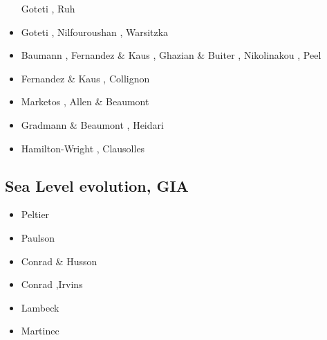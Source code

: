 \begin{scriptsize}
\begin{itemize}
                          Goteti \etal \cite{goib12}, Ruh \etal \cite{rukb12}
\item[\twothousandthirteen] Goteti \etal \cite{gobi13}, Nilfouroushan \etal \cite{nipc13}, 
                            Warsitzka \etal \cite{wakk13}
\item[\twothousandfourteen] Baumann \etal \cite{bakp14}, Fernandez \& Kaus \cite{feka14a,feka14b},
                            Ghazian \& Buiter \cite{ghbu14}, Nikolinakou \etal \cite{nifh14}, 
                            Peel \cite{peel14}
\item[\twothousandfifteen] Fernandez \& Kaus \cite{feka15}, Collignon \etal \cite{cofk15}
\item[\twothousandsixteen] Marketos \etal \cite{masg16}, Allen \& Beaumont \cite{albe16}
\item[\twothousandseventeen] Gradmann \& Beaumont \cite{grbe17}, Heidari \etal \cite{henf17}
\item[\twothousandnineteen] Hamilton-Wright \etal \cite{hadv19}, Clausolles \etal \cite{clcc19}
\end{itemize}
\end{scriptsize}

\subsection{Sea Level evolution, GIA}

\begin{scriptsize}
\begin{itemize}
\item[\nineteenseventyeight] Peltier \etal \cite{pefc78}
\item[\twothousandseven] Paulson \etal \cite{pazw07}
\item[\twothousandnine] Conrad \& Husson \cite{cohu09}
\item[\twothousandthirteen] Conrad \cite{conr13},Irvins \etal \cite{ivjw13}
\item[\twothousandfourteen] Lambeck \etal \cite{larp14}
\item[\twothousandeighteen] Martinec \etal \cite{makv18}
\end{itemize}
\end{scriptsize}

